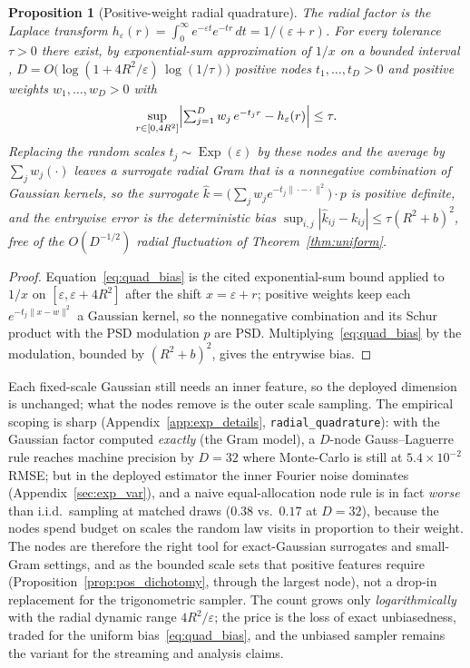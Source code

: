 \documentclass{article}
\newtheorem{proposition}[theorem]{Proposition}
\DeclareMathOperator{\Exp}{Exp}
\begin{document}
\begin{proposition}[Positive-weight radial quadrature]\label{prop:quadrature}
The radial factor is the Laplace transform $h_\varepsilon(r)=\int_0^\infty e^{-\varepsilon t}e^{-tr}\,dt=1/(\varepsilon+r)$. For every tolerance $\tau>0$ there exist, by exponential-sum approximation of $1/x$ on a bounded interval \citep{beylkin2010approximation}, $D=O\!\bigl(\log(1+4R^2/\varepsilon)\,\log(1/\tau)\bigr)$ positive nodes $t_1,\dots,t_D>0$ and positive weights $w_1,\dots,w_D>0$ with
\begin{equation}\label{eq:quad_bias}
\sup_{r\in[0,4R^2]}\Bigl|\textstyle\sum_{j=1}^D w_j\,e^{-t_j r}-h_\varepsilon(r)\Bigr|\le\tau.
\end{equation}
Replacing the random scales $t_j\sim\Exp(\varepsilon)$ by these nodes and the average by $\sum_j w_j(\cdot)$ leaves a surrogate radial Gram that is a nonnegative combination of Gaussian kernels, so the surrogate $\widehat k=\bigl(\sum_j w_j e^{-t_j\|\cdot-\cdot\|^2}\bigr)\cdot p$ is positive definite, and the entrywise error is the deterministic bias $\sup_{i,j}|\widehat k_{ij}-k_{ij}|\le\tau(R^2+b)^2$, free of the $O(D^{-1/2})$ radial fluctuation of Theorem~\ref{thm:uniform}.
\end{proposition}
\begin{proof}
Equation~\eqref{eq:quad_bias} is the cited exponential-sum bound applied to $1/x$ on $[\varepsilon,\varepsilon+4R^2]$ after the shift $x=\varepsilon+r$; positive weights keep each $e^{-t_j\|x-w\|^2}$ a Gaussian kernel, so the nonnegative combination and its Schur product with the PSD modulation $p$ are PSD. Multiplying~\eqref{eq:quad_bias} by the modulation, bounded by $(R^2+b)^2$, gives the entrywise bias.
\end{proof}
\noindent Each fixed-scale Gaussian still needs an inner feature, so the deployed dimension is unchanged; what the nodes remove is the outer scale sampling. The empirical scoping is sharp (Appendix~\ref{app:exp_details}, \texttt{radial\_quadrature}): with the Gaussian factor computed \emph{exactly} (the Gram model), a $D$-node Gauss--Laguerre rule reaches machine precision by $D=32$ where Monte-Carlo is still at $5.4\times10^{-2}$ RMSE; but in the deployed estimator the inner Fourier noise dominates (Appendix~\ref{sec:exp_var}), and a naive equal-allocation node rule is in fact \emph{worse} than i.i.d.\ sampling at matched draws ($0.38$ vs.\ $0.17$ at $D=32$), because the nodes spend budget on scales the random law visits in proportion to their weight. The nodes are therefore the right tool for exact-Gaussian surrogates and small-Gram settings, and as the bounded scale sets that positive features require (Proposition~\ref{prop:pos_dichotomy}, through the largest node), not a drop-in replacement for the trigonometric sampler. The count grows only \emph{logarithmically} with the radial dynamic range $4R^2/\varepsilon$; the price is the loss of exact unbiasedness, traded for the uniform bias~\eqref{eq:quad_bias}, and the unbiased sampler remains the variant for the streaming and analysis claims.
\end{document}
